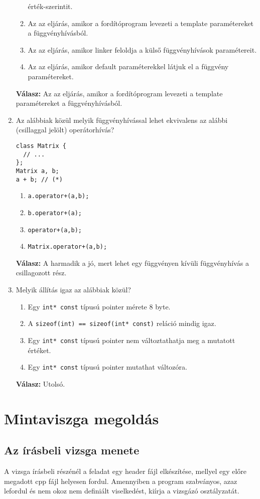 \documentclass[../cpp_book/cpp_book.tex]{subfiles}
\begin{document}
\begin{enumerate}[1.)]
\begin{enumerate}
			érték-szerintit.
			\item Az az eljárás, amikor a fordítóprogram levezeti a template paramétereket a
			függvényhívásból.
			\item Az az eljárás, amikor linker feloldja a külső függvényhívások paramétereit.
			\item Az az eljárás, amikor default paraméterekkel látjuk el a függvény
			paramétereket.
		\end{enumerate}
		\textbf{Válasz:} Az az eljárás, amikor a fordítóprogram levezeti a template paramétereket a
		függvényhívásból.
		\item Az alábbiak közül melyik függvényhívással lehet ekvivalens az alábbi
		(csillaggal jelölt) operátorhívás?
		\begin{lstlisting}
class Matrix {
  // ...
};
Matrix a, b;
a + b; // (*)
		\end{lstlisting}
		\begin{enumerate}
			\item \texttt{a.operator+(a,b);}
			\item \texttt{b.operator+(a);}
			\item \texttt{operator+(a,b);}
			\item \texttt{Matrix.operator+(a,b);}
		\end{enumerate}
		\textbf{Válasz:} A harmadik a jó, mert lehet egy függvényen kívüli függvényhívás a csillagozott rész.
		\item Melyik állítás igaz az alábbiak közül?
		\begin{enumerate}
			\item Egy \texttt{int* const} típusú pointer mérete 8 byte.
			\item A \texttt{sizeof(int) == sizeof(int* const)} reláció mindig igaz.
			\item Egy \texttt{int* const} típusú pointer nem változtathatja meg a mutatott értéket.
			\item Egy \texttt{int* const} típusú pointer mutathat változóra.
		\end{enumerate}
		\textbf{Válasz:} Utolsó.
	\end{enumerate}
	\section{Mintaviszga megoldás}
	\subsection{Az írásbeli vizsga menete}
	A vizsga írásbeli részénél a feladat egy header fájl elkészítése, mellyel egy előre megadott cpp fájl helyesen fordul. Amennyiben a program szabványos, azaz lefordul és nem okoz nem definiált viselkedést, kiírja a vizsgázó osztályzatát.
	
\end{document}
